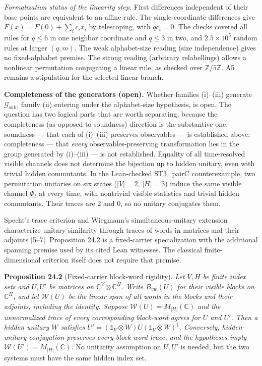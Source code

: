 \documentclass[
]{article}
\begin{document}
\emph{Formalization status of the linearity step.} First differences
independent of their base points are equivalent to an affine rule. The
single-coordinate differences give \(F(x)=F(0)+\sum_i c_i x_i\) by
telescoping, with \(qc_i=0\). The checks covered all rules for
\(q\leq6\) in one neighbor coordinate and \(q\leq3\) in two, and
\(2.5\times10^5\) random rules at larger \((q,m)\). The weak
alphabet-size reading (size independence) gives no fixed-alphabet
premise. The strong reading (arbitrary relabellings) allows a nonlinear
permutation conjugating a linear rule, as checked over
\(\mathbb Z/5\mathbb Z\). A5 remains a stipulation for the selected
linear branch.

\textbf{Completeness of the generators (open).} Whether families
(i)--(iii) generate \(\mathcal{G}_{\text{sub}}\), family (ii) entering
under the alphabet-size hypothesis, is open. The question has two
logical parts that are worth separating, because the completeness (as
opposed to soundness) direction is the substantive one: soundness ---
that each of (i)--(iii) preserves observables --- is established above;
completeness --- that \emph{every} observables-preserving transformation
lies in the group generated by (i)--(iii) --- is not established.
Equality of all time-resolved visible channels does not determine the
bijection up to hidden unitary, even with trivial hidden commutants. In
the Lean-checked ST3\_pairC counterexample, two permutation unitaries on
six states (\(|V|=2\), \(|H|=3\)) induce the same visible channel
\(\Phi_t\) at every time, with nontrivial visible statistics and trivial
hidden commutants. Their traces are \(2\) and \(0\), so no unitary
conjugates them.

Specht's trace criterion and Wiegmann's simultaneous-unitary extension
characterize unitary similarity through traces of words in matrices and
their adjoints {[}5--7{]}. Proposition 24.2 is a fixed-carrier
specialization with the additional spanning premise used by its cited
Lean witnesses. The classical finite-dimensional criterion itself does
not require that premise.

\textbf{Proposition 24.2} (Fixed-carrier block-word rigidity). \emph{Let
\(V,H\) be finite index sets and \(U,U'\) be matrices on
\(\mathbb C^V\otimes\mathbb C^H\). Write \(B_{vw}(U)\) for their visible
blocks on \(\mathbb C^H\), and let \(\mathcal W(U)\) be the linear span
of all words in the blocks and their adjoints, including the identity.
Suppose \(\mathcal W(U)=M_{|H|}(\mathbb C)\) and the unnormalized trace
of every corresponding block-word agrees for \(U\) and \(U'\). Then a
hidden unitary \(W\) satisfies
\(U'=(\mathbb 1_V\otimes W)U(\mathbb 1_V\otimes W)^\dagger\).
Conversely, hidden-unitary conjugation preserves every block-word trace,
and the hypotheses imply \(\mathcal W(U')=M_{|H|}(\mathbb C)\).} No
unitarity assumption on \(U,U'\) is needed, but the two systems must
have the same hidden index set.
\end{document}
